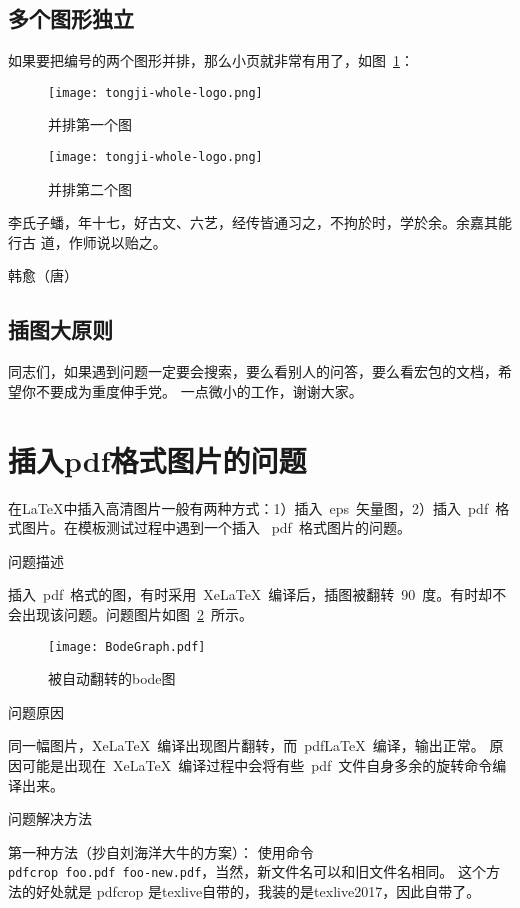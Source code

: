 \documentclass[../Main/thesis.tex]{subfiles}
\begin{document}
\subsection{多个图形独立}
如果要把编号的两个图形并排，那么小页就非常有用了，如图~\ref{fig:parallel2}：
\begin{figure}
\begin{minipage}{0.48\textwidth}
  \centering
  \texttt{[image: tongji-whole-logo.png]}
  \caption{并排第一个图}
  \label{fig:parallel1}
\end{minipage}\hfill
\begin{minipage}{0.48\textwidth}
  \centering
  \texttt{[image: tongji-whole-logo.png]}
  \caption{并排第二个图}
  \label{fig:parallel2}
\end{minipage}
\end{figure}


李氏子蟠，年十七，好古文、六艺，经传皆通习之，不拘於时，学於余。余嘉其能行古
道，作师说以贻之。

\hfill \pozhehao 韩愈（唐）


\subsection{插图大原则}
同志们，如果遇到问题一定要会搜索，要么看别人的问答，要么看宏包的文档，希望你不要成为重度伸手党。
一点微小的工作，谢谢大家。

\section{插入pdf格式图片的问题}
\label{sec:problem}
在\LaTeX{}中插入高清图片一般有两种方式：1）插入~eps~矢量图，2）插入~pdf~格式图片。在模板测试过程中遇到一个插入
~pdf~格式图片的问题。

问题描述

插入~pdf~格式的图，有时采用~XeLaTeX~编译后，插图被翻转~90~度。有时却不会出现该问题。问题图片如图~\ref{rotatedBode}~所示。
\begin{figure}[H]
  \centering
  \texttt{[image: BodeGraph.pdf]}
  \caption{被自动翻转的bode图}
  \label{rotatedBode}
\end{figure}

问题原因

同一幅图片，XeLaTeX~编译出现图片翻转，而~pdfLaTeX~编译，输出正常。
原因可能是出现在~XeLaTeX~编译过程中会将有些~pdf~文件自身多余的旋转命令编译出来。

问题解决方法

第一种方法（抄自刘海洋大牛的方案）：
使用命令\\ \texttt{pdfcrop foo.pdf foo-new.pdf}，当然，新文件名可以和旧文件名相同。 这个方法的好处就是 pdfcrop 是texlive自带的，我装的是texlive2017，因此自带了。
\end{document}
